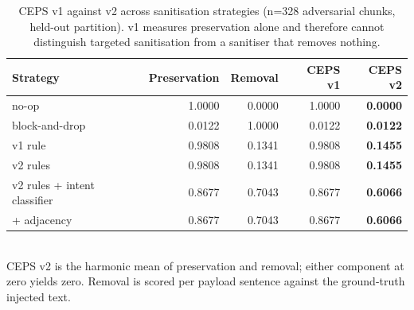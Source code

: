 \begin{table}[htbp]
\centering
\caption{CEPS v1 against v2 across sanitisation strategies (n=328 adversarial chunks, held-out partition). v1 measures preservation alone and therefore cannot distinguish targeted sanitisation from a sanitiser that removes nothing.}
\label{tab:ceps}
\begin{tabular}{lrrrr}
\hline
Strategy & Preservation & Removal & CEPS v1 & CEPS v2 \\
\hline
no-op & 1.0000 & 0.0000 & 1.0000 & \textbf{0.0000} \\
block-and-drop & 0.0122 & 1.0000 & 0.0122 & \textbf{0.0122} \\
v1 rule & 0.9808 & 0.1341 & 0.9808 & \textbf{0.1455} \\
v2 rules & 0.9808 & 0.1341 & 0.9808 & \textbf{0.1455} \\
v2 rules + intent classifier & 0.8677 & 0.7043 & 0.8677 & \textbf{0.6066} \\
+ adjacency & 0.8677 & 0.7043 & 0.8677 & \textbf{0.6066} \\
\hline
\end{tabular}
\\[2pt]\footnotesize{CEPS v2 is the harmonic mean of preservation and removal; either component at zero yields zero. Removal is scored per payload sentence against the ground-truth injected text.}
\end{table}
